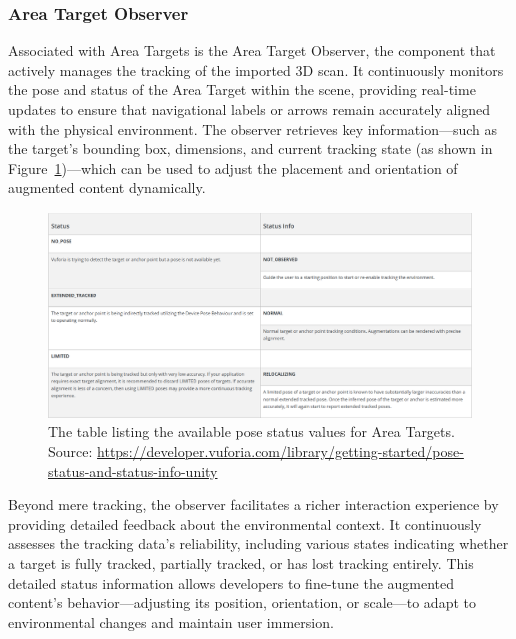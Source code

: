 \subsubsection{Area Target Observer}\label{subsub:AreaTargetObserver}
Associated with Area Targets is the Area Target Observer, the component that actively manages the tracking of the imported 3D scan. It continuously monitors the pose and status of the Area Target within the scene, providing real-time updates to ensure that navigational labels or arrows remain accurately aligned with the physical environment. The observer retrieves key information—such as the target's bounding box, dimensions, and current tracking state (as shown in Figure~\ref{fig:environment-tracking-1})—which can be used to adjust the placement and orientation of augmented content dynamically.

\begin{figure}[ht]
  \centering
  \includegraphics[scale=0.5]{content/resources/images/chap-problems-solutions/environment-tracking-1.PNG}
  \caption{The table listing the available pose status values for Area Targets. \\ \small{Source: \url{https://developer.vuforia.com/library/getting-started/pose-status-and-status-info-unity}}}
  \label{fig:environment-tracking-1}
\end{figure}

Beyond mere tracking, the observer facilitates a richer interaction experience by providing detailed feedback about the environmental context. It continuously assesses the tracking data's reliability, including various states indicating whether a target is fully tracked, partially tracked, or has lost tracking entirely. This detailed status information allows developers to fine-tune the augmented content’s behavior—adjusting its position, orientation, or scale—to adapt to environmental changes and maintain user immersion.

